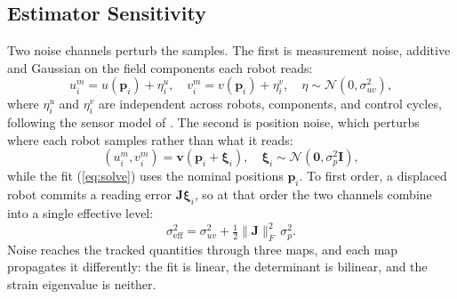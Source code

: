 \documentclass[lettersize,journal]{IEEEtran}
\begin{document}
\subsection{Estimator Sensitivity}
\label{sec:sensitivity}

Two noise channels perturb the samples. The first is measurement noise,
additive and Gaussian on the field components each robot reads:
\begin{equation}
    u_i^m = u(\mathbf{p}_i) + \eta_i^u, \quad
    v_i^m = v(\mathbf{p}_i) + \eta_i^v,
    \quad \eta \sim \mathcal{N}(0, \sigma_{uv}^2),
    \label{eq:meas_noise}
\end{equation}
where $\eta_i^u$ and $\eta_i^v$ are independent across robots,
components, and control cycles, following the sensor model of \cite{17}.
The second is position noise, which perturbs where each robot samples
rather than what it reads:
\begin{equation}
    (u_i^m, v_i^m) = \mathbf{v}(\mathbf{p}_i + \boldsymbol{\xi}_i), \quad
    \boldsymbol{\xi}_i \sim \mathcal{N}(\mathbf{0}, \sigma_p^2 \mathbf{I}),
    \label{eq:pos_noise}
\end{equation}
while the fit (\ref{eq:solve}) uses the nominal positions
$\mathbf{p}_i$. To first order, a displaced robot commits a reading
error $\mathbf{J}\boldsymbol{\xi}_i$, so at that order the two channels
combine into a single effective level:
\begin{equation}
    \sigma_{\mathrm{eff}}^2 = \sigma_{uv}^2
        + \tfrac{1}{2}\lVert\mathbf{J}\rVert_F^2\,\sigma_p^2 .
    \label{eq:sigma_eff}
\end{equation}
Noise reaches the tracked quantities through three maps, and each map
propagates it differently: the fit is linear, the determinant is
bilinear, and the strain eigenvalue is neither.
\end{document}
